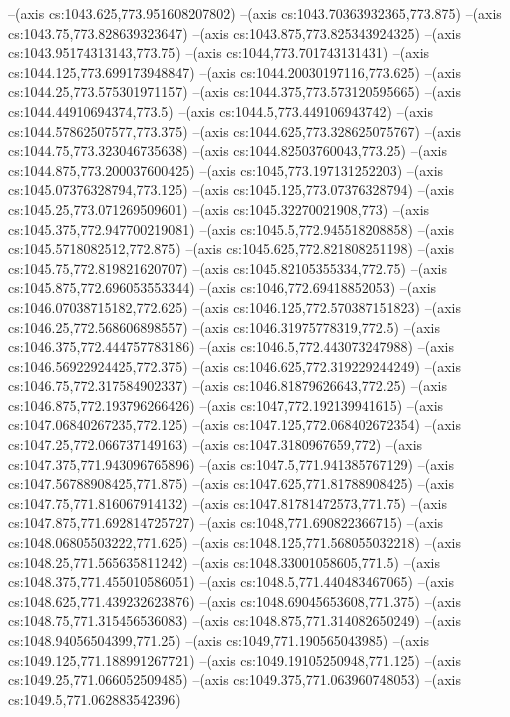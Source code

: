 --(axis cs:1043.625,773.951608207802)
--(axis cs:1043.70363932365,773.875)
--(axis cs:1043.75,773.828639323647)
--(axis cs:1043.875,773.825343924325)
--(axis cs:1043.95174313143,773.75)
--(axis cs:1044,773.701743131431)
--(axis cs:1044.125,773.699173948847)
--(axis cs:1044.20030197116,773.625)
--(axis cs:1044.25,773.575301971157)
--(axis cs:1044.375,773.573120595665)
--(axis cs:1044.44910694374,773.5)
--(axis cs:1044.5,773.449106943742)
--(axis cs:1044.57862507577,773.375)
--(axis cs:1044.625,773.328625075767)
--(axis cs:1044.75,773.323046735638)
--(axis cs:1044.82503760043,773.25)
--(axis cs:1044.875,773.200037600425)
--(axis cs:1045,773.197131252203)
--(axis cs:1045.07376328794,773.125)
--(axis cs:1045.125,773.07376328794)
--(axis cs:1045.25,773.071269509601)
--(axis cs:1045.32270021908,773)
--(axis cs:1045.375,772.947700219081)
--(axis cs:1045.5,772.945518208858)
--(axis cs:1045.5718082512,772.875)
--(axis cs:1045.625,772.821808251198)
--(axis cs:1045.75,772.819821620707)
--(axis cs:1045.82105355334,772.75)
--(axis cs:1045.875,772.696053553344)
--(axis cs:1046,772.69418852053)
--(axis cs:1046.07038715182,772.625)
--(axis cs:1046.125,772.570387151823)
--(axis cs:1046.25,772.568606898557)
--(axis cs:1046.31975778319,772.5)
--(axis cs:1046.375,772.444757783186)
--(axis cs:1046.5,772.443073247988)
--(axis cs:1046.56922924425,772.375)
--(axis cs:1046.625,772.319229244249)
--(axis cs:1046.75,772.317584902337)
--(axis cs:1046.81879626643,772.25)
--(axis cs:1046.875,772.193796266426)
--(axis cs:1047,772.192139941615)
--(axis cs:1047.06840267235,772.125)
--(axis cs:1047.125,772.068402672354)
--(axis cs:1047.25,772.066737149163)
--(axis cs:1047.3180967659,772)
--(axis cs:1047.375,771.943096765896)
--(axis cs:1047.5,771.941385767129)
--(axis cs:1047.56788908425,771.875)
--(axis cs:1047.625,771.81788908425)
--(axis cs:1047.75,771.816067914132)
--(axis cs:1047.81781472573,771.75)
--(axis cs:1047.875,771.692814725727)
--(axis cs:1048,771.690822366715)
--(axis cs:1048.06805503222,771.625)
--(axis cs:1048.125,771.568055032218)
--(axis cs:1048.25,771.565635811242)
--(axis cs:1048.33001058605,771.5)
--(axis cs:1048.375,771.455010586051)
--(axis cs:1048.5,771.440483467065)
--(axis cs:1048.625,771.439232623876)
--(axis cs:1048.69045653608,771.375)
--(axis cs:1048.75,771.315456536083)
--(axis cs:1048.875,771.314082650249)
--(axis cs:1048.94056504399,771.25)
--(axis cs:1049,771.190565043985)
--(axis cs:1049.125,771.188991267721)
--(axis cs:1049.19105250948,771.125)
--(axis cs:1049.25,771.066052509485)
--(axis cs:1049.375,771.063960748053)
--(axis cs:1049.5,771.062883542396)
